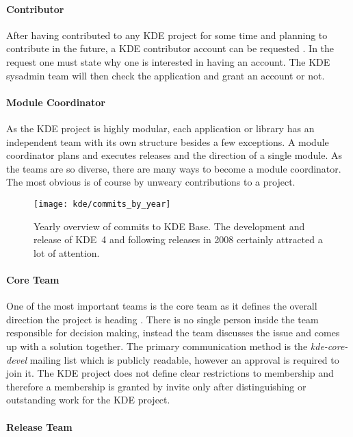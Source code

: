 \paragraph{Contributor}

After having contributed to any KDE project for some time and planning to
contribute in the future, a KDE contributor account can be requested
\cite{KDEContribute,KDEContributor}. In the request one must state why one is
interested in having an account. The KDE sysadmin team will then check the
application and grant an account or not.

\paragraph{Module Coordinator}

As the KDE project is highly modular, each application or library has an
independent team with its own structure besides a few exceptions. A module
coordinator plans and executes releases and the direction of a single module.
As the teams are so diverse, there are many ways to become a module
coordinator. The most obvious is of course by unweary contributions to a
project.

\begin{figure}[htbp]
  \centering
  \texttt{[image: kde/commits\_by\_year]}
  \caption[Commits by Year, KDE]
  {Yearly overview of commits to KDE Base. The development and release of KDE~4
    and following releases in 2008 certainly attracted a lot of attention.}
  \label{fig:kde:cby}
\end{figure}

\paragraph{Core Team}

One of the most important teams is the core team as it defines the overall
direction the project is heading \cite{KDEProjectManagement}. There is no
single person inside the team responsible for decision making, instead the team
discusses the issue and comes up with a solution together. The primary
communication method is the \emph{kde-core-devel} mailing list which is
publicly readable, however an approval is required to join it. The KDE project
does not define clear restrictions to membership and therefore a membership is
granted by invite only after distinguishing or outstanding work for the KDE
project.

\paragraph{Release Team}

